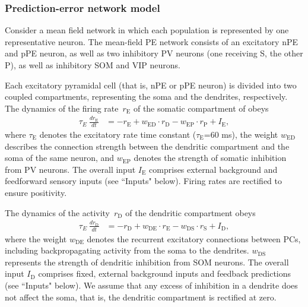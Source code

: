\documentclass[10pt,a4paper,draft]{article}
\begin{document}
\subsubsection*{Prediction-error network model}
%
Consider a mean field network in which each population is represented by one representative neuron. The mean-field PE network consists of an excitatory nPE and pPE neuron, as well as two inhibitory PV neurons (one receiving S, the other P), as well as inhibitory SOM and VIP neurons.

Each excitatory pyramidal cell (that is, nPE or pPE neuron) is divided into two coupled compartments, representing the soma and the dendrites, respectively. The dynamics of the firing rate~$r_{\mathrm{E}}$ of the somatic compartment of obeys \citep{wilson1972excitatory}
%
\begin{align}
\tau_E\ \frac{dr_\mathrm{E}}{dt} &= - r_\mathrm{E} + w_\mathrm{ED}\cdot  r_\mathrm{D}  -  w_\mathrm{EP}\cdot r_\mathrm{P} + I_\mathrm{E},
\end{align}
%
where $\tau_\mathrm{E}$ denotes the excitatory rate time constant ($\tau_\mathrm{E}$=60 ms), the weight $w_{\mathrm{ED}}$ describes the connection strength between the dendritic compartment and the soma of the same neuron, and $w_{\mathrm{EP}}$ denotes the strength of somatic inhibition from PV neurons. The overall input $I_\mathrm{E}$ comprises external background and feedforward sensory  inputs (see ``Inputs" below). Firing rates are rectified to ensure positivity.

The dynamics of the activity~$r_\mathrm{D}$ of the dendritic compartment obeys \citep{wilson1972excitatory}
%
\begin{align}
\tau_E\ \frac{dr_\mathrm{D}}{dt} &= - r_\mathrm{D} +  w_\mathrm{DE}\cdot r_\mathrm{E}  - w_\mathrm{DS}\cdot r_\mathrm{S} + I_\mathrm{D},
\end{align}
%
where the weight $w_{\mathrm{DE}}$ denotes the recurrent excitatory connections between PCs, including backpropagating activity from the soma to the dendrites. $w_{\mathrm{DS}}$ represents the strength of dendritic inhibition from SOM neurons. The overall input $I_\mathrm{D}$ comprises fixed, external background inputs and feedback predictions (see ``Inputs" below). We assume that any excess of inhibition in a dendrite does not affect the soma, that is, the dendritic compartment is rectified at zero. 
\end{document}
